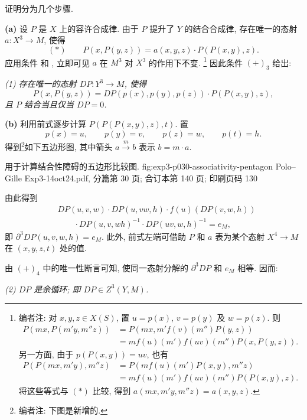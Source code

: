 证明分为几个步骤.

\smallskip
\noindent\textbf{(a)}
设 \(P\) 是 \(X\) 上的容许合成律. 由于 \(P\) 提升了
\(Y\) 的结合合成律, 存在唯一的态射 \(a:X^3\to M\), 使得
\[
 (*)\qquad
 P(x,P(y,z))=a(x,y,z)\cdot P(P(x,y),z).
\]
应用条件  和
,
立即可见 \(a\) 在 \(M^3\) 对 \(X^3\) 的作用下不变.
\footnote{编者注: 对 \(x,y,z\in X(S)\), 置 \(u=p(x)\),
\(v=p(y)\) 及 \(w=p(z)\). 则
\[
\begin{aligned}
 P(mx,P(m'y,m''z))
  &=P(mx,m'f(v)(m'')P(y,z))\\
  &=mf(u)(m')f(uv)(m'')P(x,P(y,z)).
\end{aligned}
\]
另一方面, 由于 \(p(P(x,y))=uv\), 也有
\[
\begin{aligned}
 P(P(mx,m'y),m''z)
  &=P(mf(u)(m')P(x,y),m''z)\\
  &=mf(u)(m')f(uv)(m'')P(P(x,y),z).
\end{aligned}
\]
将这些等式与 \((*)\) 比较, 得到
\(a(mx,m'y,m''z)=a(x,y,z)\).}
因此条件 \((+)_{3}\) 给出:

\smallskip
\noindent\textit{(1) 存在唯一的态射
\(DP:Y^3\to M\), 使得}
\[
 P(x,P(y,z))=DP(p(x),p(y),p(z))\cdot P(P(x,y),z),
\]
\textit{且 \(P\) 结合当且仅当 \(DP=0\).}

\smallskip
\noindent\textbf{(b)}
利用前式逐步计算 \(P(P(P(x,y),z),t)\). 置
\[
 p(x)=u,\qquad p(y)=v,\qquad p(z)=w,\qquad p(t)=h.
\]
得到\footnote{编者注: 下图是新增的.}如下五边形图,
其中箭头 \(a\xrightarrow{m}b\) 表示 \(b=m\cdot a\).

 {用于计算结合性障碍的五边形比较图.}
 {fig:exp3-p030-associativity-pentagon}
 {Polo--Gille Exp3-14oct24.pdf, 分篇第 30 页; 合订本第 140 页; 印刷页码 130}

由此得到
\[
\begin{aligned}
 &DP(u,v,w)\cdot DP(u,vw,h)\cdot f(u)(DP(v,w,h))\\
 &\qquad\cdot DP(u,v,wh)^{-1}\cdot DP(uv,w,h)^{-1}=e_M,
\end{aligned}
\]
即 \(\partial^3DP(u,v,w,h)=e_M\). 此外, 前式左端可借助
\(P\) 和 \(a\) 表为某个态射 \(X^4\to M\)
在 \((x,y,z,t)\) 处的值.

由 \((+)_{4}\) 中的唯一性断言可知,
使同一态射分解的 \(\partial^3DP\) 和 \(e_M\) 相等. 因而:

\smallskip
\noindent\textit{(2) \(DP\) 是余循环; 即
\(DP\in Z^3(Y,M)\).}

